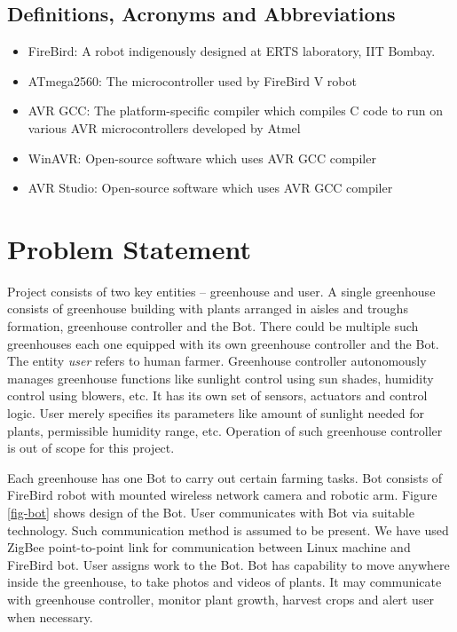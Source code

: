 \documentclass[a4paper, 12pt]{article}
\begin{document}
\subsection{Definitions, Acronyms and Abbreviations}
\begin{itemize}
 \item FireBird: A robot indigenously designed at ERTS laboratory, IIT Bombay. \cite{fbhwmanual, fbswmanual, eyantra}
 \item ATmega2560: The microcontroller used by FireBird V robot
 \item AVR GCC: The platform-specific compiler which compiles C code to run on various AVR microcontrollers developed by Atmel
 \item WinAVR: Open-source software which uses AVR GCC compiler
 \item AVR Studio: Open-source software which uses AVR GCC compiler
\end{itemize}

\section{Problem Statement}
Project consists of two key entities -- greenhouse and user. A single greenhouse consists of greenhouse building with
plants arranged in aisles and troughs formation, greenhouse controller and the Bot. There could be multiple such 
greenhouses each one equipped with its own greenhouse controller and the Bot. The entity \emph{user} refers to human farmer.
Greenhouse controller autonomously manages greenhouse functions like sunlight control using sun shades, humidity control using
blowers, etc. It has its own set of sensors, actuators and control logic. User merely specifies its parameters 
like amount of sunlight needed for plants, permissible humidity range, etc. Operation of such greenhouse 
controller is out of scope for this project.

Each greenhouse has one Bot to carry out certain farming tasks. Bot consists of FireBird robot with mounted 
wireless network camera and robotic arm. Figure \ref{fig-bot} shows design of the Bot.
User communicates with Bot via suitable technology. Such communication method is assumed to be 
present. We have used ZigBee point-to-point link for communication between Linux machine and FireBird bot.
User assigns work to the Bot. Bot has capability to move anywhere inside the greenhouse, to take photos and 
videos of plants. It may communicate with greenhouse controller, monitor plant growth, harvest crops and 
alert user when necessary.
\end{document}
